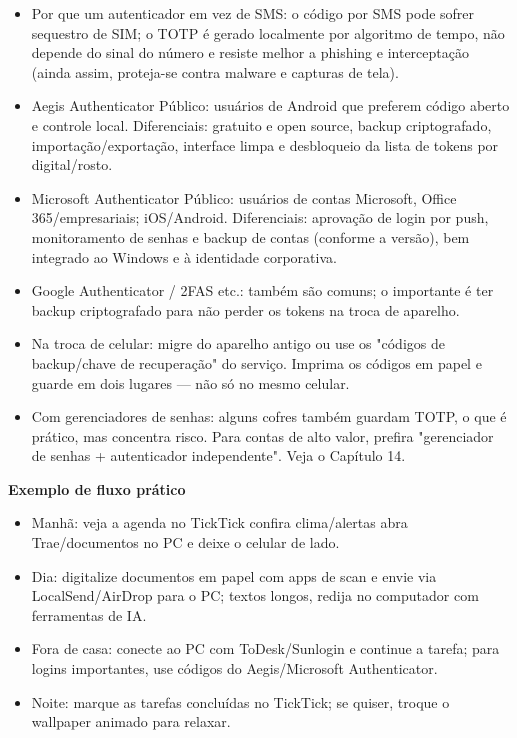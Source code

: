 \begin{itemize}
  \item Por que um autenticador em vez de SMS: o código por SMS pode sofrer sequestro de SIM; o TOTP é gerado localmente por algoritmo de tempo, não depende do sinal do número e resiste melhor a phishing e interceptação (ainda assim, proteja-se contra malware e capturas de tela).
  \item Aegis Authenticator Público: usuários de Android que preferem código aberto e controle local. Diferenciais: gratuito e open source, backup criptografado, importação/exportação, interface limpa e desbloqueio da lista de tokens por digital/rosto.
  \item Microsoft Authenticator Público: usuários de contas Microsoft, Office 365/empresariais; iOS/Android. Diferenciais: aprovação de login por push, monitoramento de senhas e backup de contas (conforme a versão), bem integrado ao Windows e à identidade corporativa.
  \item Google Authenticator / 2FAS etc.: também são comuns; o importante é ter backup criptografado para não perder os tokens na troca de aparelho.
  \item Na troca de celular: migre do aparelho antigo ou use os "códigos de backup/chave de recuperação" do serviço. Imprima os códigos em papel e guarde em dois lugares — não só no mesmo celular.
  \item Com gerenciadores de senhas: alguns cofres também guardam TOTP, o que é prático, mas concentra risco. Para contas de alto valor, prefira "gerenciador de senhas + autenticador independente". Veja o Capítulo 14.
\end{itemize}


\textbf{Exemplo de fluxo prático}\par

\begin{itemize}
  \item Manhã: veja a agenda no TickTick confira clima/alertas abra Trae/documentos no PC e deixe o celular de lado.
  \item Dia: digitalize documentos em papel com apps de scan e envie via LocalSend/AirDrop para o PC; textos longos, redija no computador com ferramentas de IA.
  \item Fora de casa: conecte ao PC com ToDesk/Sunlogin e continue a tarefa; para logins importantes, use códigos do Aegis/Microsoft Authenticator.
  \item Noite: marque as tarefas concluídas no TickTick; se quiser, troque o wallpaper animado para relaxar.
\end{itemize}

